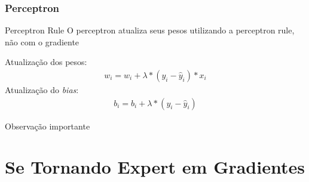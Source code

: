 \documentclass{beamer}
\begin{document}
\begin{frame}
	\frametitle{Perceptron}
	\begin{block}{Perceptron Rule}
		O perceptron atualiza seus pesos utilizando a perceptron rule, não com o gradiente
	\end{block}
	Atualização dos pesos:
	\begin{gather*}
		w_i = w_i + \lambda*(y_i -  \hat{y}_i)* x_i
	\end{gather*}
	Atualização do \textit{bias}:
	\begin{gather*}
		b_i = b_i + \lambda*(y_i -  \hat{y}_i)
	\end{gather*}
	\begin{alertblock}{Observação importante}
		\href{http://tex.stackexchange.com/q/20800/5701}{}
	\end{alertblock}
	
\end{frame}

\section{Se Tornando Expert em Gradientes}
\end{document}
